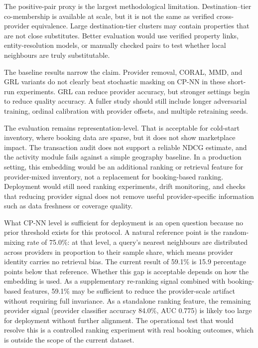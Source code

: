 \documentclass[conference,a4paper]{IEEEtran}
\begin{document}
The positive-pair proxy is the largest methodological limitation. Destination--tier co-membership is available at scale, but it is not the same as verified cross-provider equivalence. Large destination-tier clusters may contain properties that are not close substitutes. Better evaluation would use verified property links, entity-resolution models, or manually checked pairs to test whether local neighbours are truly substitutable.

The baseline results narrow the claim. Provider removal, CORAL, MMD, and GRL variants do not clearly beat stochastic masking on CP-NN in these short-run experiments. GRL can reduce provider accuracy, but stronger settings begin to reduce quality accuracy. A fuller study should still include longer adversarial training, ordinal calibration with provider offsets, and multiple retraining seeds.

The evaluation remains representation-level. That is acceptable for cold-start inventory, where booking data are sparse, but it does not show marketplace impact. The transaction audit does not support a reliable NDCG estimate, and the activity module fails against a simple geography baseline. In a production setting, this embedding would be an additional ranking or retrieval feature for provider-mixed inventory, not a replacement for booking-based ranking. Deployment would still need ranking experiments, drift monitoring, and checks that reducing provider signal does not remove useful provider-specific information such as data freshness or coverage quality.

What CP-NN level is sufficient for deployment is an open question because no prior threshold exists for this protocol. A natural reference point is the random-mixing rate of 75.0\%: at that level, a query's nearest neighbours are distributed across providers in proportion to their sample share, which means provider identity carries no retrieval bias. The current result of 59.1\% is 15.9 percentage points below that reference. Whether this gap is acceptable depends on how the embedding is used. As a supplementary re-ranking signal combined with booking-based features, 59.1\% may be sufficient to reduce the provider-scale artifact without requiring full invariance. As a standalone ranking feature, the remaining provider signal (provider classifier accuracy 84.0\%, AUC 0.775) is likely too large for deployment without further alignment. The operational test that would resolve this is a controlled ranking experiment with real booking outcomes, which is outside the scope of the current dataset.
\end{document}
